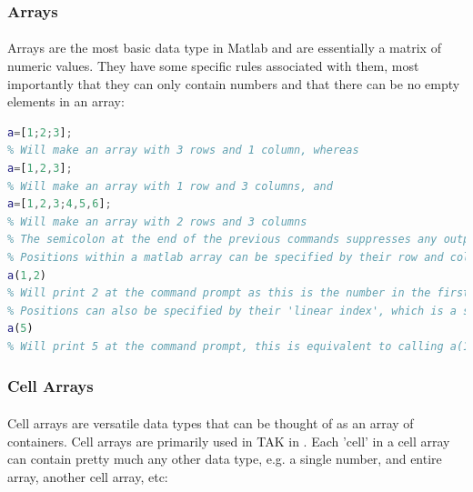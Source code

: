 \subsubsection{Arrays}
\paragraph{}Arrays are the most basic data type in Matlab and are essentially a matrix of numeric values. They have some specific rules associated with them, most importantly that they can only contain numbers and that there can be no empty elements in an array:

\begin{lstlisting}[language=Matlab]
% To make an array, values separated by semicolons indicate rows and values separated by commas indicate columns, and encasing them in brackets indicates that it is an array, so
a=[1;2;3];
% Will make an array with 3 rows and 1 column, whereas
a=[1,2,3];
% Will make an array with 1 row and 3 columns, and
a=[1,2,3;4,5,6];
% Will make an array with 2 rows and 3 columns
% The semicolon at the end of the previous commands suppresses any output to the command prompt
% Positions within a matlab array can be specified by their row and column position (note that the first index in Matlab is 1, not 0 like in C, Java, Python, etc), so calling
a(1,2)
% Will print 2 at the command prompt as this is the number in the first row and second column.
% Positions can also be specified by their 'linear index', which is a single number that starts counting from position (1,1) and proceeds down columns and then across rows, so
a(5) 
% Will print 5 at the command prompt, this is equivalent to calling a(1,3)
\end{lstlisting}

\subsubsection{Cell Arrays}
\paragraph{}Cell arrays are versatile data types that can be thought of as an array of containers. Cell arrays are primarily used in TAK in . Each 'cell' in a cell array can contain pretty much any other data type, e.g. a single number, and entire array, another cell array, etc:

